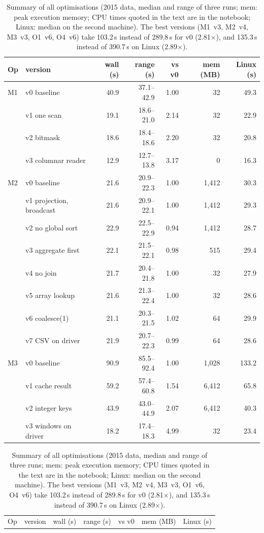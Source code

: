 \documentclass[sigconf]{acmart}
\begin{document}
\begin{table}[t]
\centering\scriptsize\setlength{\tabcolsep}{3pt}
\caption{Summary of all optimisations (2015 data, median and range of three runs; mem: peak execution memory; CPU times
quoted in the text are in the notebook; Linux: median on the second machine). The best versions (M1~v3, M2~v4, M3~v3, O1~v6, O4~v6)
take 103.2\,s instead of 289.8\,s for v0 (2.81$\times$), and 135.3\,s instead of 390.7\,s on Linux (2.89$\times$).}
\label{tab:summary}
\begin{tabular}[t]{@{}llrrrrr@{}}
\toprule
Op & version & wall (s) & range (s) & vs v0 & mem (MB) & Linux (s) \\
\midrule
M1 & v0 baseline & 40.9 & 37.1--42.9 & 1.00 & 32 & 49.3 \\
 & v1 one scan & 19.1 & 18.6--21.0 & 2.14 & 32 & 22.9 \\
 & v2 bitmask & 18.6 & 18.4--18.6 & 2.20 & 32 & 20.8 \\
 & v3 columnar reader & 12.9 & 12.7--13.8 & 3.17 & 0 & 16.3 \\
\midrule
M2 & v0 baseline & 21.6 & 20.9--22.3 & 1.00 & 1{,}412 & 30.3 \\
 & v1 projection, broadcast & 21.6 & 20.9--22.1 & 1.00 & 1{,}412 & 29.3 \\
 & v2 no global sort & 22.9 & 22.5--22.9 & 0.94 & 1{,}412 & 28.7 \\
 & v3 aggregate first & 22.1 & 21.5--22.1 & 0.98 & 515 & 29.4 \\
 & v4 no join & 21.7 & 20.4--21.8 & 1.00 & 32 & 27.9 \\
 & v5 array lookup & 21.6 & 21.3--22.4 & 1.00 & 32 & 28.6 \\
 & v6 coalesce(1) & 21.1 & 20.3--21.5 & 1.02 & 64 & 29.9 \\
 & v7 CSV on driver & 21.9 & 20.7--22.3 & 0.99 & 64 & 28.6 \\
\midrule
M3 & v0 baseline & 90.9 & 85.5--92.4 & 1.00 & 1{,}028 & 133.2 \\
 & v1 cache result & 59.2 & 57.4--60.8 & 1.54 & 6{,}412 & 65.8 \\
 & v2 integer keys & 43.9 & 43.0--44.9 & 2.07 & 6{,}412 & 40.3 \\
 & v3 windows on driver & 18.2 & 17.4--18.3 & 4.99 & 32 & 23.4 \\
\bottomrule
\end{tabular}\hfill
\begin{tabular}[t]{@{}llrrrrr@{}}
\toprule
Op & version & wall (s) & range (s) & vs v0 & mem (MB) & Linux (s) \\

\end{tabular}
\end{table}
\end{document}
